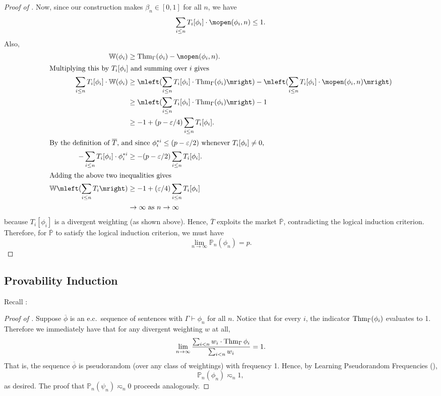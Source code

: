 \documentclass[authordate,onecolumn,noenvironments]{miri-tech-article}
\numberwithin{equation}{subsection}
\newcommand{\seq}[1]{{\overline{#1}}}
\newcommand{\nn}{n}
\newcommand{\fuz}{w}
\newcommand{\phis}{\seq{\phi}}
\newcommand{\ec}[1][\ ]{e.c.#1}
\newcommand{\lic}{logical induction criterion}
\newcommand{\trade}{T}%
\newcommand{\Trader}{\seq{\trade}} %
\newcommand{\strat}{T} %
\newcommand{\BelState}{\mathbb{P}}
\newcommand{\pt}{\BelState}
\newcommand{\MP}{\seq{\pt}}
\newcommand{\World}{\mathbb{W}}
\newcommand{\Theory}{\Gamma}
\newcommand{\thmind}[1][\Theory]{\operatorname{Thm}_{#1}\-} %
\begin{document}
\begin{proof}[Proof of ]
  \newcommand{\minval}{\operatorname{minval}}

  \noindent Now, since our construction makes $\beta_\nn\in[0,1]$ for all $\nn$, we have
  \[\sum_{i\le\nn} \trade_i[\phi_i]\cdot\mopen(\phi_i,n) \leq 1.\]
  Also, 
  \begin{align*}
    \World(\phi_i) &\geq\thmind(\phi_i)-\mopen(\phi_i,n).\\
    \intertext{Multiplying this by $\strat_i[\phi_i]$ and summing over $i$ gives}
    \sum_{i\le\nn} \trade_i[\phi_i]\cdot\World(\phi_i) 
    &\ge \mleft(\sum_{i\le\nn} \trade_i[\phi_i]\cdot\thmind(\phi_i)\mright) - \mleft(\sum_{i\le\nn} \trade_i[\phi_i]\cdot\mopen(\phi_i,n)\mright)\\
    &\ge \mleft(\sum_{i\le\nn} \trade_i[\phi_i]\cdot\thmind(\phi_i)\mright) - 1 \\
    &\ge  - 1 + (p-\varepsilon/4)\sum_{i\le\nn} \trade_i[\phi_i].\\
    \intertext{By the definition of $\Trader$, and since $\phi_{i}^{*i}\le(p-\varepsilon/2)$ whenever $\strat_i[\phi_i]\neq 0$,}
    -\sum_{i\le\nn} \strat_i[\phi_i]\cdot\phi_{i}^{*i} &\ge - (p-\varepsilon/2)\sum_{i\le\nn} \strat_i[\phi_i].\\
    \intertext{Adding the above two inequalities gives}
    \World\mleft(\sum_{i\le\nn} \strat_i\mright) &\ge -1 + (\varepsilon/4)\sum_{i\le\nn} \strat_i[\phi_i]\\
    &\to\infty \text{ as } \nn\to\infty
  \end{align*}
  because $\strat_i[\phi_i]$ is a divergent weighting (as shown above).  Hence, $\Trader$ exploits the market $\MP$, contradicting the \lic{}.  Therefore, for $\MP$ to satisfy the \lic{}, we must have
  \[\lim_{n\to\infty}\pt_\nn(\phi_\nn) = p.\]
\end{proof}


\subsection{Provability Induction}\label{sec:provind}
Recall :
\restatepi*

\begin{proof}[Proof of ]
  Suppose $\phis$ is  an \ec sequence of sentences with $\Theory \vdash \phi_\nn$ for all $n$.  Notice that for every $i$, the indicator $\thmind(\phi_i)$ evaluates to 1. Therefore we immediately have that for any divergent weighting $\fuz$ at all, 
  \[\lim_{\nn \to\infty} \frac{\sum_{i < \nn} \fuz_{i} \cdot \thmind{\phi_i}}{\sum_{i < n} \fuz_{i}}= 1.\]
  \noindent That is, the sequence $\phis$ is pseudorandom (over any class of weightings) with frequency 1.  Hence, by Learning Pseudorandom Frequencies (), 
  \[  \pt_\nn(\phi_\nn) \eqsim_\nn 1,\]
  as desired. The proof that $\pt_\nn(\psi_\nn) \eqsim_\nn 0$ proceeds analogously.
\end{proof}
\end{document}
